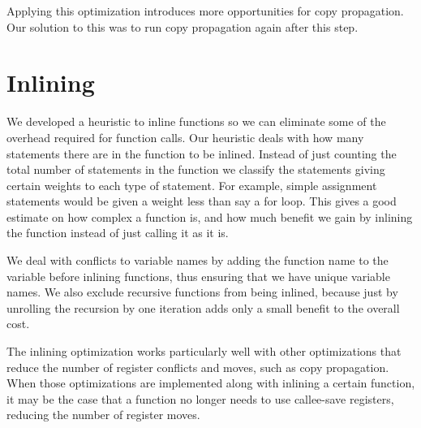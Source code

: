 \documentclass[aps,letterpaper,11pt]{revtex4}
\begin{document}
Applying this optimization introduces more opportunities for copy propagation. Our solution to this was to
run copy propagation again after this step.

\section{Inlining}
We developed a heuristic to inline functions so we can eliminate some of the
overhead required for function calls. Our heuristic deals with how many
statements there are in the function to be inlined. Instead of just counting
the total number of statements in the function we classify the statements
giving certain weights to each type of statement. For example, simple
assignment statements would be given a weight less than say a for loop.
This gives a good estimate on how complex a function is, and how much
benefit we gain by inlining the function instead of just calling it as it
is.

We deal with conflicts to variable names by adding the function name to the
variable before inlining functions, thus ensuring that we have unique variable
names. We also exclude recursive functions from being inlined, because
just by unrolling the recursion by one iteration adds only a small benefit
to the overall cost.

The inlining optimization works particularly well with other optimizations that
reduce the number of register conflicts and moves, such as copy propagation. 
When those optimizations are implemented along with inlining a certain function,
it may be the case that a function no longer needs to use callee-save registers,
reducing the number of register moves.
\end{document}
